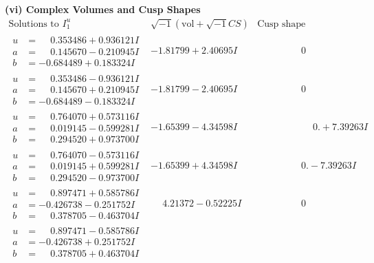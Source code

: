 \documentclass[1p]{elsarticle_modified}
\theoremstyle{definition}
\newcommand{\I}{\sqrt{-1}}
\begin{document}
\newpage\flushleft \textbf{(vi) Complex Volumes and Cusp Shapes}
$$\begin{array}{c|c|c}  
\text{Solutions to }I^u_{1}& \I (\text{vol} + \sqrt{-1}CS) & \text{Cusp shape}\\
 \hline 
\begin{aligned}
u &= \phantom{-}0.353486 + 0.936121 I \\
a &= \phantom{-}0.145670 - 0.210945 I \\
b &= -0.684489 + 0.183324 I\end{aligned}
 & -1.81799 + 2.40695 I & \phantom{-0.000000 } 0 \\ \hline\begin{aligned}
u &= \phantom{-}0.353486 - 0.936121 I \\
a &= \phantom{-}0.145670 + 0.210945 I \\
b &= -0.684489 - 0.183324 I\end{aligned}
 & -1.81799 - 2.40695 I & \phantom{-0.000000 } 0 \\ \hline\begin{aligned}
u &= \phantom{-}0.764070 + 0.573116 I \\
a &= \phantom{-}0.019145 - 0.599281 I \\
b &= \phantom{-}0.294520 + 0.973700 I\end{aligned}
 & -1.65399 - 4.34598 I & \phantom{-0.000000 -}0. + 7.39263 I \\ \hline\begin{aligned}
u &= \phantom{-}0.764070 - 0.573116 I \\
a &= \phantom{-}0.019145 + 0.599281 I \\
b &= \phantom{-}0.294520 - 0.973700 I\end{aligned}
 & -1.65399 + 4.34598 I & \phantom{-0.000000 } 0. - 7.39263 I \\ \hline\begin{aligned}
u &= \phantom{-}0.897471 + 0.585786 I \\
a &= -0.426738 - 0.251752 I \\
b &= \phantom{-}0.378705 - 0.463704 I\end{aligned}
 & \phantom{-}4.21372 - 0.52225 I & \phantom{-0.000000 } 0 \\ \hline\begin{aligned}
u &= \phantom{-}0.897471 - 0.585786 I \\
a &= -0.426738 + 0.251752 I \\
b &= \phantom{-}0.378705 + 0.463704 I\end{aligned}

\end{array}$$
\end{document}

